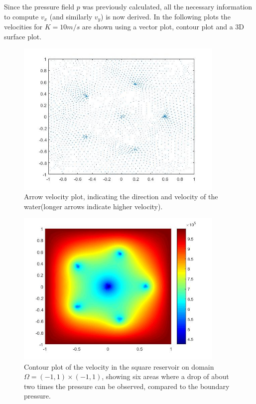 \documentclass[a4paper]{report}
\begin{document}
Since the pressure field $p$ was previously calculated, all the necessary information to compute $v_x$ (and similarly $v_y$) is now derived. In the following plots the velocities for $K=10m/s$ are shown using a vector plot, contour plot and a 3D surface plot.



\begin{figure}[ht!]
	\centering
	\includegraphics[width=100mm]{2Dvarrows.jpg}
	\caption{Arrow velocity plot, indicating the direction and velocity of the water(longer arrows indicate higher velocity).
	\label{overflow}}
\end{figure}

\begin{figure}[ht!]
	\centering
	\includegraphics[width=100mm]{2Dvheat.jpg}
	\caption{Contour plot of the velocity in the square reservoir on domain $\Omega=(-1,1)\times(-1,1)$, showing six areas where a drop of about two times the pressure can be observed, compared to the boundary pressure.
	\label{overflow}}
\end{figure}
\end{document}
